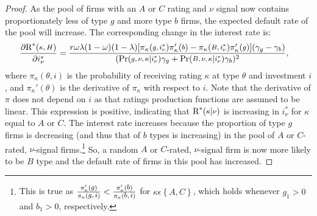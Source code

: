 \documentclass[notitlepage]{article}
\begin{document}
\begin{proof}
As the pool of firms with an $A$ or $C$ rating and $\nu$ signal now contains proportionately less of type $g$ and more type $b$ firms, the expected default rate of the pool will increase. The corresponding change in the interest rate is:
\begin{align}
\frac{\partial \textup{R}^{*}(\medmath{\kappa,H})}{\partial i^{*}_{\nu}} &= 
\frac{r\omega\lambda(1-\omega)(1-\lambda)[\pi_{\kappa}(\medmath{g,i^{*}_{\nu}})\pi_{\kappa}' (\medmath{b})-\pi_{\kappa}(\medmath{B,i^{*}_{\nu}})\pi_{\kappa}' (\medmath{g})](\gamma_{g}-\gamma_{b})}{(\textup{Pr}(\medmath{g,\nu,\kappa}|\medmath{i^{*}_{\nu}})\gamma_g + \textup{Pr}(\medmath{B,\nu,\kappa}|\medmath{i^{*}_{\nu}})\gamma_b)^2},
\end{align}
where $\pi_{\kappa}(\theta,i)$ is the probability of receiving rating $\kappa$ at type $\theta$ and investment $i$, and $\pi_{\kappa}'(\theta)$ is the derivative of $\pi_{\kappa}$ with respect to $i$. Note that the derivative of $\pi$ does not depend on $i$ as that ratings production functions are assumed to be linear. This expression is positive, indicating that $\textup{R}^{*}(\medmath{\kappa}|\medmath{\nu})$ is increasing in $i^{*}_{\nu}$ for $\kappa$ equal to $A$ or $C$. The interest rate increases because the proportion of type $g$ firms is decreasing (and thus that of $b$ types is increasing) in the pool of $A$ or $C$-rated, $\nu$-signal firms.\footnote{This is true as $\frac{\pi_{\kappa}'(\medmath{g})}{\pi_{\kappa}(\medmath{g,i})}<\frac{\pi_{\kappa}'(\medmath{b})}{\pi_{\kappa}(\medmath{b,i})}$ for $\kappa\epsilon\left\{A,C\right\}$, which holds whenever $g_{1}>0$ and $b_{1}>0$, respectively.} So, a random $A$ or $C$-rated, $\nu$-signal firm is now more likely to be $B$ type and the default rate of firms in this pool has increased.


\end{proof}
\end{document}

